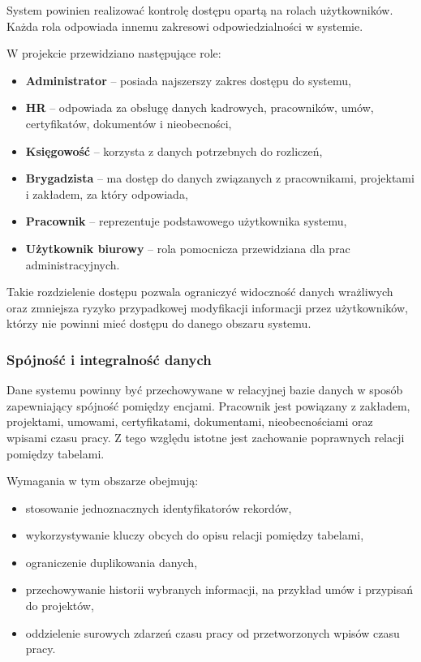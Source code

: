 System powinien realizować kontrolę dostępu opartą na rolach użytkowników. Każda rola odpowiada innemu zakresowi odpowiedzialności w systemie.

W projekcie przewidziano następujące role:
\begin{itemize}
    \item \textbf{Administrator} -- posiada najszerszy zakres dostępu do systemu,
    \item \textbf{HR} -- odpowiada za obsługę danych kadrowych, pracowników, umów, certyfikatów, dokumentów i nieobecności,
    \item \textbf{Księgowość} -- korzysta z danych potrzebnych do rozliczeń,
    \item \textbf{Brygadzista} -- ma dostęp do danych związanych z pracownikami, projektami i zakładem, za który odpowiada,
    \item \textbf{Pracownik} -- reprezentuje podstawowego użytkownika systemu,
    \item \textbf{Użytkownik biurowy} -- rola pomocnicza przewidziana dla prac administracyjnych.
\end{itemize}

Takie rozdzielenie dostępu pozwala ograniczyć widoczność danych wrażliwych oraz zmniejsza ryzyko przypadkowej modyfikacji informacji przez użytkowników, którzy nie powinni mieć dostępu do danego obszaru systemu.

\subsubsection{Spójność i integralność danych}

Dane systemu powinny być przechowywane w relacyjnej bazie danych w sposób zapewniający spójność pomiędzy encjami. Pracownik jest powiązany z zakładem, projektami, umowami, certyfikatami, dokumentami, nieobecnościami oraz wpisami czasu pracy. Z tego względu istotne jest zachowanie poprawnych relacji pomiędzy tabelami.

Wymagania w tym obszarze obejmują:
\begin{itemize}
    \item stosowanie jednoznacznych identyfikatorów rekordów,
    \item wykorzystywanie kluczy obcych do opisu relacji pomiędzy tabelami,
    \item ograniczenie duplikowania danych,
    \item przechowywanie historii wybranych informacji, na przykład umów i przypisań do projektów,
    \item oddzielenie surowych zdarzeń czasu pracy od przetworzonych wpisów czasu pracy.
\end{itemize}

